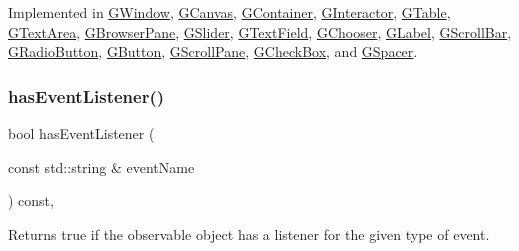 Implemented in \mbox{\hyperlink{classGWindow_a9896d58fcfebbf1025aeeb5b8b9ede80}{G\+Window}}, \mbox{\hyperlink{classGCanvas_a9896d58fcfebbf1025aeeb5b8b9ede80}{G\+Canvas}}, \mbox{\hyperlink{classGContainer_a9896d58fcfebbf1025aeeb5b8b9ede80}{G\+Container}}, \mbox{\hyperlink{classGInteractor_a799e073a127b428cc841086d42ea4fed}{G\+Interactor}}, \mbox{\hyperlink{classGTable_a9896d58fcfebbf1025aeeb5b8b9ede80}{G\+Table}}, \mbox{\hyperlink{classGTextArea_a9896d58fcfebbf1025aeeb5b8b9ede80}{G\+Text\+Area}}, \mbox{\hyperlink{classGBrowserPane_a9896d58fcfebbf1025aeeb5b8b9ede80}{G\+Browser\+Pane}}, \mbox{\hyperlink{classGSlider_a9896d58fcfebbf1025aeeb5b8b9ede80}{G\+Slider}}, \mbox{\hyperlink{classGTextField_a9896d58fcfebbf1025aeeb5b8b9ede80}{G\+Text\+Field}}, \mbox{\hyperlink{classGChooser_a9896d58fcfebbf1025aeeb5b8b9ede80}{G\+Chooser}}, \mbox{\hyperlink{classGLabel_a9896d58fcfebbf1025aeeb5b8b9ede80}{G\+Label}}, \mbox{\hyperlink{classGScrollBar_a9896d58fcfebbf1025aeeb5b8b9ede80}{G\+Scroll\+Bar}}, \mbox{\hyperlink{classGRadioButton_a9896d58fcfebbf1025aeeb5b8b9ede80}{G\+Radio\+Button}}, \mbox{\hyperlink{classGButton_a9896d58fcfebbf1025aeeb5b8b9ede80}{G\+Button}}, \mbox{\hyperlink{classGScrollPane_a9896d58fcfebbf1025aeeb5b8b9ede80}{G\+Scroll\+Pane}}, \mbox{\hyperlink{classGCheckBox_a9896d58fcfebbf1025aeeb5b8b9ede80}{G\+Check\+Box}}, and \mbox{\hyperlink{classGSpacer_a9896d58fcfebbf1025aeeb5b8b9ede80}{G\+Spacer}}.

\mbox{\label{classGObservable_a9f6faaa25942923bafa1c44020c49fa9}} 
\subsubsection{\texorpdfstring{has\+Event\+Listener()}{hasEventListener()}}
{\footnotesize\ttfamily bool has\+Event\+Listener (\begin{DoxyParamCaption}\item[{const std\+::string \&}]{event\+Name }\end{DoxyParamCaption}) const\hspace{0.3cm}{\ttfamily [protected]}, {\ttfamily [virtual]}}



Returns true if the observable object has a listener for the given type of event. 

\mbox{\label{classGObservable_aeec1adc19aa0f33de62390686ee1382c}} 
